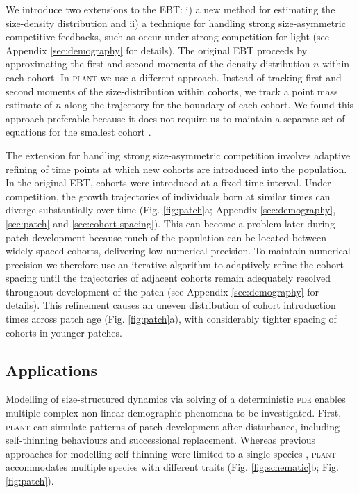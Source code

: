 \documentclass[a4paper,11pt]{article}
\newcommand{\plant}{\textsc{plant}}
\begin{document}
We introduce two extensions to the \textsc{EBT}: i) a new method for estimating
the size-density distribution and ii) a technique for handling strong
size-asymmetric competitive feedbacks, such as occur under strong
competition for light (see Appendix \ref{sec:demography} for
details). The original \textsc{EBT} \citep{Deroos-1988,
  Deroos-1992, Deroos-1997} proceeds by approximating the first and
second moments of the density distribution \(n\) within each
cohort. In {\plant} we use a different approach. Instead of tracking
first and second moments of the size-distribution within cohorts, we
track a point mass estimate of \(n\) along the trajectory for the
boundary of each cohort. We found this approach preferable because it
does not require us to maintain a separate set of equations for the
smallest cohort \citep{Deroos-1997}.

The extension for handling strong size-asymmetric competition involves
adaptive refining of time points at which new cohorts are introduced
into the population. In the original \textsc{EBT}, cohorts were introduced at a
fixed time interval. Under competition, the growth trajectories of
individuals born at similar times can diverge substantially over time
(Fig. \ref{fig:patch}a; Appendix \ref{sec:demography},
\ref{sec:patch} and \ref{sec:cohort-spacing}). This can become a
problem later during patch development because much of the population
can be located between widely-spaced cohorts, delivering low numerical
precision. To maintain numerical precision we therefore use an
iterative algorithm to adaptively refine the cohort spacing until the
trajectories of adjacent cohorts remain adequately resolved throughout
development of the patch (see Appendix \ref{sec:demography} for
details). This refinement causes an uneven distribution of cohort
introduction times across patch age (Fig.  \ref{fig:patch}a), with
considerably tighter spacing of cohorts in younger patches.

\subsection{Applications}

Modelling of size-structured dynamics via solving of a deterministic \textsc{pde}
enables multiple complex non-linear demographic phenomena to be
investigated. First, {\plant} can simulate patterns of patch development after
disturbance, including self-thinning behaviours and successional
replacement. Whereas previous approaches for modelling self-thinning
were limited to a single species
\citep[e.g.][]{Barnes-2004, Coomes-2007}, {\plant} accommodates multiple
 species with different traits (Fig. \ref{fig:schematic}b; Fig.
\ref{fig:patch}).
\end{document}
